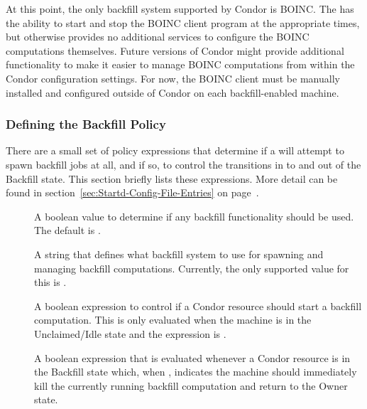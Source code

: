 At this point, the only backfill system supported by Condor is BOINC. 
The  has the ability to start and stop the BOINC client
program at the appropriate times, but otherwise provides no additional
services to configure the BOINC computations themselves.
Future versions of Condor might provide additional functionality to
make it easier to manage BOINC computations from within the Condor
configuration settings.
For now, the BOINC client must be manually installed and configured
outside of Condor on each backfill-enabled machine.


\subsubsection{\label{sec:Backfill-Policy}Defining the Backfill Policy}


There are a small set of policy expressions that determine if a
 will attempt to spawn backfill jobs at all, and if so,
to control the transitions in to and out of the Backfill state.
This section briefly lists these expressions.
More detail can be found in
section~\ref{sec:Startd-Config-File-Entries} on
page~\pageref{sec:Startd-Config-File-Entries}.

\begin{description}

\item[] A boolean value to determine if any
  backfill functionality should be used.
  The default is .

\item[] A string that defines what backfill
  system to use for spawning and managing backfill computations.
  Currently, the only supported value for this is .
  
\item[] A boolean expression to control if a
  Condor resource should start a backfill computation.
  This is only evaluated when the machine is in the Unclaimed/Idle
  state and the  expression is .

\item[] A boolean expression that is evaluated
  whenever a Condor resource is in the Backfill state which, when
  , indicates the machine should immediately kill the
  currently running backfill computation and return to the Owner
  state.

\end{description}

